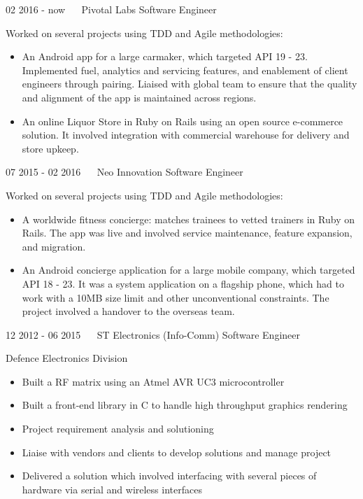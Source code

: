 \documentclass[]{friggeri-cv}
\begin{document}
\begin{entrylist}
	\entry
	{02 2016 - now  \ \ }
	{Pivotal Labs}
	{Software Engineer}
	{Worked on several projects using TDD and Agile methodologies:
	\begin{itemize}[itemsep=0pt,topsep=0pt]
	\item An Android app for a large carmaker, which targeted API 19 - 23. Implemented fuel, analytics and servicing features, and enablement of client engineers through pairing. Liaised with global team to ensure that the quality and alignment of the app is maintained across regions.
	\item An online Liquor Store in Ruby on Rails using an open source e-commerce solution. It involved integration with commercial warehouse for delivery and store upkeep.
	\end{itemize}}
	
	\entry
	{07 2015 - 02 2016   \ \ }
	{Neo Innovation}
	{Software Engineer}
	{Worked on several projects using TDD and Agile methodologies:
	\begin{itemize}[itemsep=0pt,topsep=0pt]
	\item A worldwide fitness concierge: matches trainees to vetted trainers in Ruby on Rails. The app was live and involved service maintenance, feature expansion, and migration.
	\item An Android concierge application for a large mobile company, which targeted API 18 - 23. It was a system application on a flagship phone, which had to work with a 10MB size limit and other unconventional constraints. The project involved a handover to the overseas team.
	\end{itemize}}

	\entry
	{12 2012 - 06 2015   \ \ }
	{ST Electronics (Info-Comm)}
	{Software Engineer}
	{Defence Electronics Division
	\begin{itemize}[itemsep=0pt,topsep=0pt]
	\item Built a RF matrix using an Atmel AVR UC3 microcontroller
	\item Built a front-end library in C to handle high throughput graphics rendering
	\item Project requirement analysis and solutioning
	\item Liaise with vendors and clients to develop solutions and manage project
	\item Delivered a solution which involved interfacing with several pieces of hardware via serial and wireless interfaces
	\end{itemize}}
	

\end{entrylist}
\end{document}
